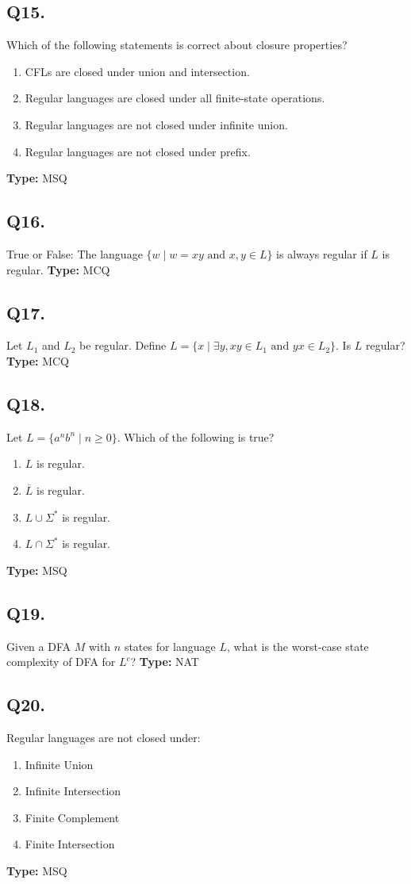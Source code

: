 \subsection*{Q15.}
Which of the following statements is correct about closure properties?
\begin{enumerate}[label=(\alph*)]
    \item CFLs are closed under union and intersection.
    \item Regular languages are closed under all finite-state operations.
    \item Regular languages are not closed under infinite union.
    \item Regular languages are not closed under prefix.
\end{enumerate}
\textbf{Type:} MSQ

\subsection*{Q16.}
True or False: The language $\{ w \mid w = xy \text{ and } x, y \in L \}$ is always regular if $L$ is regular.  
\textbf{Type:} MCQ

\subsection*{Q17.}
Let $L_1$ and $L_2$ be regular. Define $L = \{ x \mid \exists y, xy \in L_1 \text{ and } yx \in L_2 \}$. Is $L$ regular?
\textbf{Type:} MCQ

\subsection*{Q18.}
Let $L = \{ a^n b^n \mid n \geq 0 \}$. Which of the following is true?
\begin{enumerate}[label=(\alph*)]
    \item $L$ is regular.
    \item $\overline{L}$ is regular.
    \item $L \cup \Sigma^*$ is regular.
    \item $L \cap \Sigma^*$ is regular.
\end{enumerate}
\textbf{Type:} MSQ

\subsection*{Q19.}
Given a DFA $M$ with $n$ states for language $L$, what is the worst-case state complexity of DFA for $L^c$?
\textbf{Type:} NAT

\subsection*{Q20.}
Regular languages are not closed under:
\begin{enumerate}[label=(\alph*)]
    \item Infinite Union
    \item Infinite Intersection
    \item Finite Complement
    \item Finite Intersection
\end{enumerate}
\textbf{Type:} MSQ

